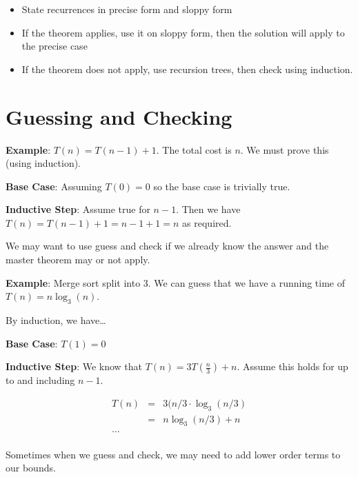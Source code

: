 \documentclass[12pt]{article}
\begin{document}
\begin{itemize}
    \item State recurrences in precise form and sloppy form
    \item If the theorem applies, use it on sloppy form, then the solution will
        apply to the precise case
    \item If the theorem does not apply, use recursion trees, then check using
        induction.
\end{itemize}

\section{Guessing and Checking}

\textbf{Example}: $T(n) = T(n-1) + 1$. The total cost is $n$. We must prove this
(using induction).

\textbf{Base Case}: Assuming $T(0) = 0$ so the base case is trivially true.

\textbf{Inductive Step}:
Assume true for $n-1$. Then we have $T(n) = T(n-1) + 1 = n-1 + 1 = n$ as
required.

We may want to use guess and check if we already know the answer and the master
theorem may or not apply.

\textbf{Example}: Merge sort split into 3. We can guess that we have a running
time of $T(n) = n \log_3(n)$.

By induction, we have\dots

\textbf{Base Case}: $T(1) = 0$

\textbf{Inductive Step}:
We know that $T(n) = 3T\left(\frac{n}{3}\right) + n$. Assume this holds for
up to and including $n-1$.

\begin{eqnarray*}
    T(n) &=&  3(n/3 \cdot \log_3(n/3)\\
    &=& n \log_3(n/3) + n\\
    \dots\\
\end{eqnarray*}

Sometimes when we guess and check, we may need to add lower order terms to our
bounds.
\end{document}
